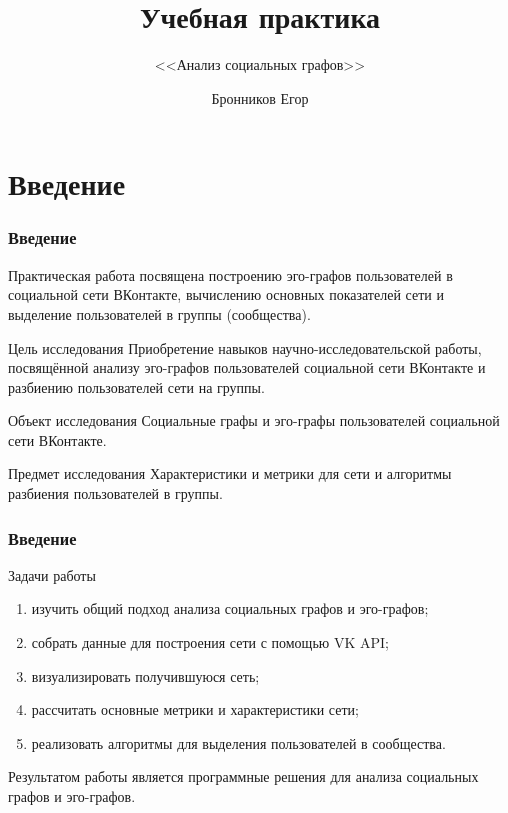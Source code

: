 \documentclass{spbseu}
\title[]{Учебная практика}
\subtitle{<<Анализ социальных графов>>}
\date{}
\institute{СПбГЭУ}
\author[]{Бронников Егор}
\begin{document}
	\begin{frame}
		\titlepage
	\end{frame}
	
	\begin{frame}
		\tableofcontents
	\end{frame}
	
	\section{Введение}
	\begin{frame}
		\frametitle{Введение}
		\tableofcontents[part=1, pausesections]
        Практическая работа посвящена построению эго-графов пользователей в социальной сети ВКонтакте, вычислению основных показателей сети и выделение пользователей в группы (сообщества).
		\begin{block}{Цель исследования}
            \justifying
            Приобретение навыков научно-исследовательской работы, посвящённой анализу эго-графов пользователей социальной сети ВКонтакте и разбиению пользователей сети на группы.
		\end{block}
		\begin{block}{Объект исследования}
            \justifying
            Социальные графы и эго-графы пользователей социальной сети ВКонтакте.
		\end{block}
		\begin{block}{Предмет исследования}
            \justifying
			Характеристики и метрики для сети и алгоритмы разбиения пользователей в группы.
		\end{block}
	\end{frame}

	\begin{frame}
		\frametitle{Введение}
		\begin{block}{Задачи работы}
			\begin{enumerate}
                \justifying
				\item изучить общий подход анализа социальных графов и эго-графов;
				\item собрать данные для построения сети с помощью VK API;
				\item визуализировать получившуюся сеть;
				\item рассчитать основные метрики и характеристики сети;
                \item реализовать алгоритмы для выделения пользователей в сообщества.
			\end{enumerate}
		\end{block}
		\vskip10pt
        Результатом работы является программные решения для анализа социальных графов и эго-графов.
	\end{frame}
	
\end{document}

